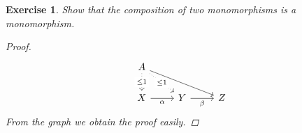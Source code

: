 \documentclass{article}
\theoremstyle{breakstyle}
\newtheorem{exercise}{Exercise}[section]
\begin{document}
\begin{exercise}
Show that the composition of two monomorphisms is a monomorphism.

\begin{proof}
	$$
	\begin{tikzcd}
        A \arrow[d, "\leq1" description, dotted] \arrow[rd, "\leq1" description, dotted] \arrow[rrd] &                       &   \\
        X \arrow[r, "\alpha"']                                                                       & Y \arrow[r, "\beta"'] & Z
	\end{tikzcd}
	$$ 
	From the graph we obtain the proof easily.
\end{proof}

\end{exercise}
\end{document}

